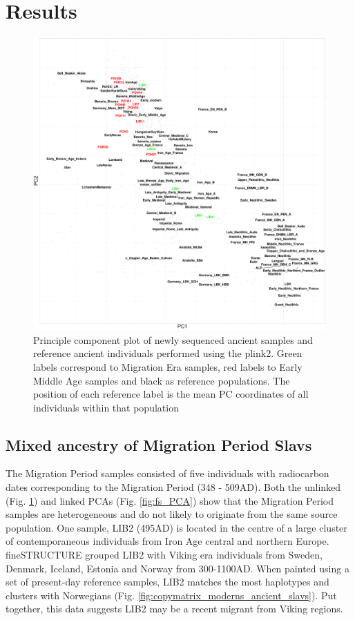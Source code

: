 \section{Results}


\begin{figure}[htp]
    \centering
    \includegraphics[width=1.0\textwidth]{../images/chapter5/plink_pca.pdf}
    \caption{Principle component plot of newly sequenced ancient samples and reference ancient individuals performed using the plink2. Green labels correspond to Migration Era samples, red labels to Early Middle Age samples and black as reference populations. The position of each reference label is the mean PC coordinates of all individuals within that population}
    \label{fig:AllChr.plink_PCA}
\end{figure}


\subsection{Mixed ancestry of Migration Period Slavs}

The Migration Period samples consisted of five individuals with radiocarbon dates corresponding to the Migration Period (348 - 509AD). Both the unlinked (Fig. \ref{fig:AllChr.plink_PCA}) and linked PCAs (Fig. \ref{fig:fs_PCA}) show that the Migration Period samples are heterogeneous and do not likely to originate from the same source population. One sample, LIB2 (495AD) is located in the centre of a large cluster of contemporaneous individuals from Iron Age central and northern Europe. fineSTRUCTURE grouped LIB2 with Viking era individuals from Sweden, Denmark, Iceland, Estonia and Norway from 300-1100AD. When painted using a set of present-day reference samples, LIB2 matches the most haplotypes and clusters with Norwegians (Fig. \ref{fig:copymatrix_moderns_ancient_slavs}). Put together, this data suggests LIB2 may be a recent migrant from Viking regions. 

